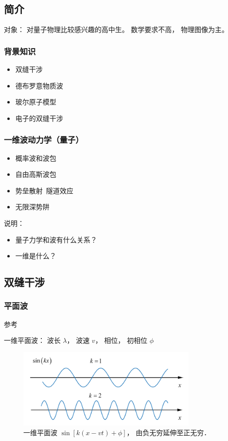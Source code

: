 \subsection{简介}
对象： 对量子物理比较感兴趣的高中生。 数学要求不高， 物理图像为主。

\subsubsection{背景知识}
\begin{itemize}
\item 双缝干涉
\item 德布罗意物质波
\item 玻尔原子模型
\item 电子的双缝干涉
\end{itemize}

\subsubsection{一维波动力学（量子）}
\begin{itemize}
\item 概率波和波包
\item 自由高斯波包
\item 势垒散射\ 隧道效应
\item 无限深势阱
\end{itemize}

说明：
\begin{itemize}
\item 量子力学和波有什么关系？
\item 一维是什么？
\end{itemize}

\subsection{双缝干涉}

\subsubsection{平面波}

参考

一维平面波： 波长 $\lambda$， 波速 $v$， 相位， 初相位 $\phi$
\begin{figure}[ht]
\centering
\includegraphics[width=9cm]{./figures/QMIntr2.png}
\caption{一维平面波 $\sin[k(x-vt) + \phi]$， 由负无穷延伸至正无穷．} \label{QMIntr_fig2}
\end{figure}


